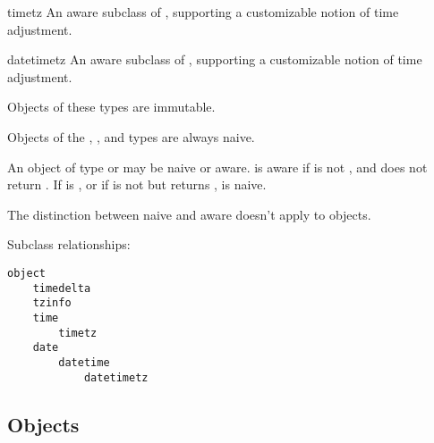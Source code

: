\begin{classdesc*}{timetz}
  An aware subclass of , supporting a customizable notion of
  time adjustment.
\end{classdesc*}

\begin{classdesc*}{datetimetz}
  An aware subclass of , supporting a customizable notion of
  time adjustment.
\end{classdesc*}

Objects of these types are immutable.

Objects of the , , and  types
are always naive.

An object  of type  or  may be
naive or aware.   is aware if  is not
, and  does not return
.  If  is , or if
 is not  but
 returns , 
is naive.

The distinction between naive and aware doesn't apply to
 objects.

Subclass relationships:

\begin{verbatim}
object
    timedelta
    tzinfo
    time
        timetz
    date
        datetime
            datetimetz
\end{verbatim}

\subsection{ Objects \label{datetime-timedelta}}

